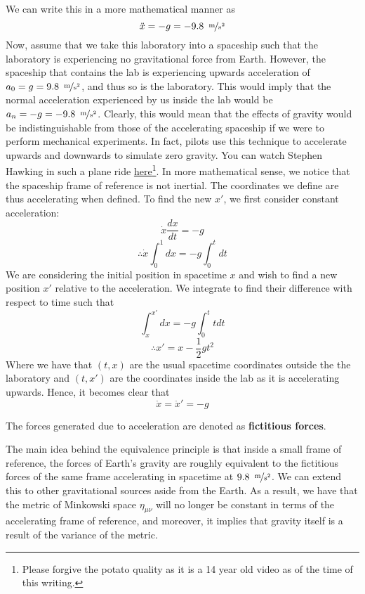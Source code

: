 \documentclass{article}
\begin{document}
\begin{exmp}
 			\noindent
 			We can write this in a more mathematical manner as
 			$$ \ddot{x} = -g = -9.8 \,\,\, \nicefrac{\text{m}}{\text{s}^2}$$
 			Now, assume that we take this laboratory into a spaceship such that the laboratory is experiencing no gravitational force from Earth. However, the spaceship that contains the lab is experiencing upwards acceleration of $a_0 = g = 9.8 \,\,\, \nicefrac{\text{m}}{\text{s}^2}$, and thus so is the laboratory. This would imply that the normal acceleration experienced by us inside the lab would be $a_n = -g = -9.8 \,\,\, \nicefrac{\text{m}}{\text{s}^2}$. Clearly, this would mean that the effects of gravity would be indistinguishable from those of the accelerating spaceship if we were to perform mechanical experiments. In fact, pilots use this technique to accelerate upwards and downwards to simulate zero gravity. You can watch Stephen Hawking in such a plane ride \href{https://www.youtube.com/watch?v=OhIpdSZQZlI}{here}\footnote{Please forgive the potato quality as it is a 14 year old video as of the time of this writing.}. In more mathematical sense, we notice that the spaceship frame of reference is not inertial. The coordinates we define are thus accelerating when defined. To find the new $x'$, we first consider constant acceleration:
 			$$ \dot{x} \frac{dx}{dt} = -g$$
 			$$ \therefore \dot{x} \int_0^1dx = -g\int_0^tdt$$
 			We are considering the initial position in spacetime $x$ and wish to find a new position $x'$ relative to the acceleration. We integrate to find their difference with respect to time such that
 			$$\int_x^{x'} dx = -g \int_0^t t dt $$
 			$$ \therefore x' = x - \frac12gt^2$$ 
 			Where we have that $(t,x)$ are the usual spacetime coordinates outside the the laboratory and $(t, x')$ are the coordinates inside the lab as it is accelerating upwards. Hence, it becomes clear that
 			$$ \ddot{x} = \ddot{x}' = -g$$
 			\begin{defn}
 				The forces generated due to acceleration are denoted as \textbf{fictitious forces}.
 			\end{defn}
 			The main idea behind the equivalence principle is that inside a small frame of reference, the forces of Earth's gravity are roughly equivalent to the fictitious forces of the same frame accelerating in spacetime at $9.8 \,\,\, \nicefrac{\text{m}}{\text{s}^2}$. We can extend this to other gravitational sources aside from the Earth. As a result, we have that the metric of Minkowski space $\eta_{\mu\nu}$ will no longer be constant in terms of the accelerating frame of reference, and moreover, it implies that gravity itself is a result of the variance of the metric.
 		\pagebreak
 			

\end{exmp}
\end{document}
